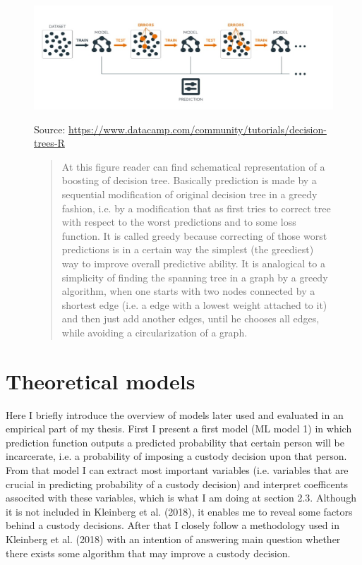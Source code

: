 \documentclass[12pt, twoside,openany]{book} %
\begin{document}
\begin{figure}[H]
\includegraphics[width=\textwidth]{boosting_scheme.jpg}
{\small Source: \url{https://www.datacamp.com/community/tutorials/decision-trees-R} \newline
 \begin{quotation}
At this figure reader can find schematical representation of a boosting of decision tree. Basically prediction is made by a sequential modification of original decision tree in a greedy fashion, i.e. by a modification that as first tries to correct tree with respect to the worst predictions and to some loss function. It is called greedy because correcting of those worst predictions is in a certain way the simplest (the greediest) way to improve overall predictive ability. It is analogical to a simplicity of finding the spanning tree in a graph by a greedy algorithm, when one starts with two nodes connected by a shortest edge (i.e. a edge with a lowest weight attached to it) and then just add another edges, until he chooses all edges, while avoiding a circularization of a graph.
\end{quotation}
 }
\end{figure}


\newpage
\section{Theoretical models}    %
Here I briefly introduce the overview of models later used and evaluated in an empirical part of my thesis. First I present a first model (ML model 1) in which prediction function outputs a predicted probability that certain person will be incarcerate, i.e. a probability of imposing a custody decision upon that person. From that model I can extract most important variables (i.e. variables that are crucial in predicting probability of a custody decision) and interpret coefficents associted with these variables, which is what I am doing at section 2.3. Although it is not included in Kleinberg et al. (2018), it enables me to reveal some factors behind a custody decisions. After that I closely follow a methodology used in Kleinberg et al. (2018) with an intention of answering main question whether there exists some algorithm that may improve a custody decision.
\end{document}
